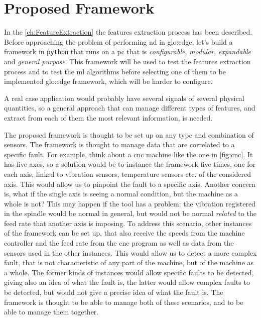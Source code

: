 \chapter{Proposed Framework}
\label{ch:Framework}

In the \autoref{ch:FeatureExtraction} the features extraction process has been described. Before approaching the problem of performing \gls{nd} in \gls{glo:edge}, let's build a framework in \texttt{python} that runs on a \gls{pc} that is \emph{configurable}, \emph{modular}, \emph{expandable} and \emph{general purpose}. This framework will be used to test the features extraction process and to test the \gls{ml} algorithms before selecting one of them to be implemented \gls{glo:edge} framework, which will be harder to configure.

A real case application would probably have several signals of several physical quantities, so a general approach that can manage different types of features, and extract from each of them the most relevant information, is needed.

The proposed framework is thought to be set up on any type and combination of sensors. The framework is thought to manage data that are correlated to a specific fault. For example, think about a \gls{cnc} machine like the one in \autoref{fig:cnc}. It has five axes, so a solution would be to instance the framework five times, one for each axis, linked to vibration sensors, temperature sensors etc. of the considered axis. This would allow us to pinpoint the fault to a specific axis. Another concern is, what if the single axis is seeing a normal condition, but the machine as a whole is not? This may happen if the tool has a problem: the vibration registered in the spindle would be normal in general, but would not be normal \emph{related} to the feed rate that another axis is imposing. To address this scenario, other instances of the framework can be set up, that also receive the speeds from the machine controller and the feed rate from the \gls{cnc} program as well as data from the sensors used in the other instances. This would allow us to detect a more complex fault, that is not characteristic of any part of the machine, but of the machine as a whole. The former kinds of instances would allow specific faults to be detected, giving also an idea of what the fault is, the latter would allow complex faults to be detected, but would not give a precise idea of what the fault is. The framework is thought to be able to manage both of these scenarios, and to be able to manage them together.

